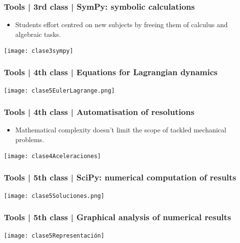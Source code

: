 \documentclass[aspectratio=169]{beamer}
\begin{document}
\begin{frame}
	\frametitle{Tools | 3rd class | SymPy: symbolic calculations}
	\begin{block}{}
		\begin{itemize}
			\item Students effort centred on new subjects by freeing them  of calculus and algebraic tasks.
		\end{itemize}
	\texttt{[image: clase3sympy]}
	\end{block}
\end{frame}


\begin{frame}
	\frametitle{Tools | 4th class | Equations for Lagrangian dynamics}
	\begin{block}{}
	\texttt{[image: clase5EulerLagrange.png]}
	\end{block}
\end{frame}


\begin{frame}
	\frametitle{Tools | 4th class | Automatisation of resolutions}
	\begin{block}{}
		\begin{itemize}
			\item Mathematical complexity doesn't limit the scope of tackled mechanical problems.
		\end{itemize}
	\texttt{[image: clase4Aceleraciones]}
	\end{block}
\end{frame}


\begin{frame}
	\frametitle{Tools | 5th class | SciPy: numerical computation of results}
	\begin{block}{}
	\texttt{[image: clase5Soluciones.png]}
	\end{block}
\end{frame}


\begin{frame}
	\frametitle{Tools | 5th class | Graphical analysis of numerical results}
	\begin{block}{}
	\texttt{[image: clase5Representación]}
	\end{block}
\end{frame}
\end{document}
